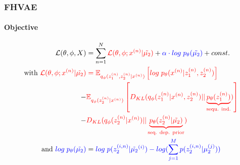 \documentclass[9pt]{beamer}
\begin{document}
\begin{frame}
\frametitle{FHVAE}
\framesubtitle{Objective}
\begin{align*}
\mathcal{L}(\theta, \phi, X)& = \sum_{n=1}^N \color{red}\mathcal{L}(\theta, \phi;x^{(n)}|\tilde{\mu_2}) \color{black}+\color{blue} \alpha \cdot log\;p_{\theta}(\tilde{\mu_2})\color{black} + const.\\
\text{with }\color{red}\mathcal{L}(\theta, \phi;x^{(n)}|\tilde{\mu_2}) &\color{red}= \mathbb{E}_{q_{\phi}(z_1^{(n)},z_2^{(n)}|x^{(n)})}\left[ log\;p_{\theta}(x^{(n)}|z_1^{(n)},z_2^{(n)}) \right]\\
-& \color{red}\mathbb{E}_{q_{\phi}(z_2^{(n)}|x^{(n)})} \left[ D_{KL}(q_{\phi}(z_1^{(n)}|x^{(n)},z_2^{(n)}) ||\underbrace{p_{\theta}(z_1^{(n)})}_{\text{sequ. ind.}}) \right]\\
-&\color{red}D_{KL}(q_{\phi}(z_2^{(n)}|x^{(n)})||\underbrace{p_{\theta}(z_2^{(n)}|\tilde{\mu_2})}_{\text{seq. dep. prior}})\\
\color{black}\text{and }\color{blue}log\;p_{\theta}(\tilde{\mu_2}) &=\color{blue} log\;p(z_{2}^{(i,n)}|\tilde{\mu_2}^{(i)}) - log(\sum_{j=1}^{M}p(z_2^{(i,n)}|\mu_2^{(j)}))
\end{align*}
\end{frame} 
\end{document}
